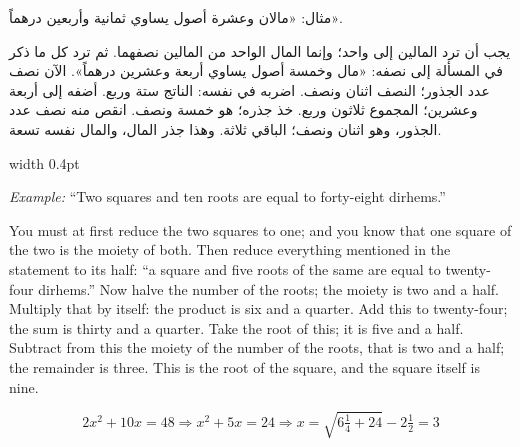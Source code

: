 \documentclass[11pt,a4paper,openany,oneside]{book}
\begin{document}
\vspace{0.5cm}

\noindent\begin{minipage}[t]{0.48\textwidth}
\raggedleft

\begin{Arabic}
مثال: «مالان وعشرة أصول يساوي ثمانية وأربعين درهماً».

يجب أن ترد المالين إلى واحد؛ وإنما المال الواحد من المالين نصفهما. ثم ترد كل ما ذكر في المسألة إلى نصفه: «مال وخمسة أصول يساوي أربعة وعشرين درهماً». الآن نصف عدد الجذور؛ النصف اثنان ونصف. اضربه في نفسه: الناتج ستة وربع. أضفه إلى أربعة وعشرين؛ المجموع ثلاثون وربع. خذ جذره؛ هو خمسة ونصف. انقص منه نصف عدد الجذور، وهو اثنان ونصف؛ الباقي ثلاثة. وهذا جذر المال، والمال نفسه تسعة.
\end{Arabic}

\end{minipage}%
\hfill\vrule width 0.4pt\hfill
\begin{minipage}[t]{0.48\textwidth}
\raggedright

\textit{Example:} ``Two squares and ten roots are equal to forty-eight dirhems.''

You must at first reduce the two squares to one; and you know that one square of the two is the moiety of both. Then reduce everything mentioned in the statement to its half: ``a square and five roots of the same are equal to twenty-four dirhems.'' Now halve the number of the roots; the moiety is two and a half. Multiply that by itself: the product is six and a quarter. Add this to twenty-four; the sum is thirty and a quarter. Take the root of this; it is five and a half. Subtract from this the moiety of the number of the roots, that is two and a half; the remainder is three. This is the root of the square, and the square itself is nine.

\begin{equation}
2x^2 + 10x = 48 \Rightarrow x^2 + 5x = 24 \Rightarrow
x = \sqrt{6\tfrac{1}{4} + 24} - 2\tfrac{1}{2} = 3
\end{equation}

\end{minipage}
\vspace{0.3cm}

\newpage
\end{document}
